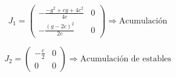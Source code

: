 \documentclass[twocolumn,aps,prl]{revtex4-1}
\begin{document}



$$J_1 =
\begin{pmatrix}
    -\frac{-g^2+cg+4c^2}{4c}
    &
    0
    \\  
    -\frac{\left(g-2c\right)^2}{2c}
    &
    0
\end{pmatrix}
\Rightarrow \text{Acumulación}
$$




$$J_2=
\begin{pmatrix}
    -\frac{c}{2}
    &
    0
    \\  
    0
    &
    0
\end{pmatrix}
\Rightarrow \text{Acumulación de estables} 
$$

\end{document}
